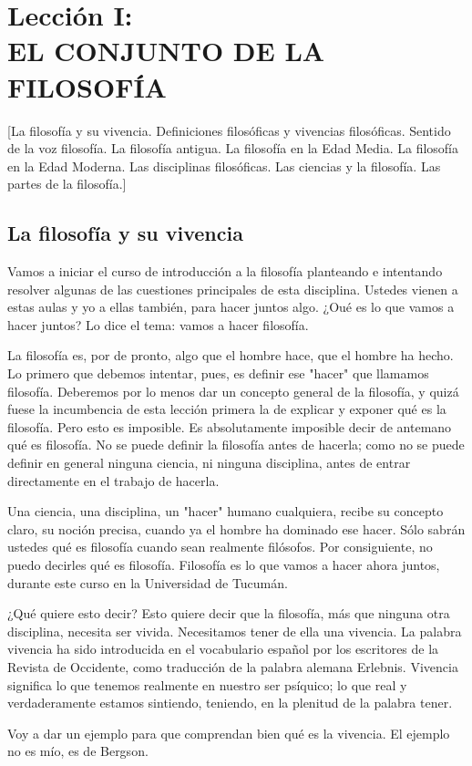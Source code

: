\documentclass[10pt,letterpaper]{book}
\author{Manuel Garc\'{i}a Morente}
\begin{document}
\chapter*{Lecci\'{o}n I:\\EL CONJUNTO DE LA FILOSOF\'{I}A}
[La filosofía y su vivencia. Definiciones filosóficas y vivencias filosóficas. Sentido de la voz filosofía. La filosofía antigua. La filosofía en la Edad Media. La filosofía en la Edad Moderna. Las disciplinas filosóficas. Las ciencias y la filosofía. Las partes de la filosofía.]
\section*{La filosofía y su vivencia}
Vamos a iniciar el curso de introducción a la filosofía planteando e intentando resolver algunas de las cuestiones principales de esta disciplina. Ustedes vienen a estas aulas y yo a ellas también, para hacer juntos algo. ¿Oué es lo que vamos a hacer juntos? Lo dice el tema: vamos a hacer filosofía.

La filosofía es, por de pronto, algo que el hombre hace, que el hombre ha hecho. Lo primero que debemos intentar, pues, es definir ese "hacer" que llamamos filosofía. Deberemos por lo menos dar un concepto general de la filosofía, y quizá fuese la incumbencia de esta lección primera la de explicar y exponer qué es la filosofía. Pero esto es imposible. Es absolutamente imposible decir de antemano qué es filosofía. No se
puede definir la filosofía antes de hacerla; como no se puede definir en general ninguna ciencia, ni ninguna disciplina, antes de entrar directamente en el trabajo de hacerla.

Una ciencia, una disciplina, un "hacer" humano cualquiera, recibe su concepto claro, su noción precisa, cuando ya el hombre ha dominado ese hacer. Sólo sabrán ustedes qué es filosofía cuando sean realmente filósofos. Por consiguiente, no puedo decirles qué es filosofía. Filosofía es lo que vamos a hacer ahora juntos, durante este curso en la Universidad de Tucumán.

¿Qué quiere esto decir? Esto quiere decir que la filosofía, más que ninguna otra disciplina, necesita ser vivida. Necesitamos tener de ella una \guillemotleft vivencia\guillemotright. La palabra vivencia ha sido introducida en el vocabulario español por los escritores de la Revista de Occidente, como traducción de la palabra alemana \guillemotleft Erlebnis\guillemotright. Vivencia significa lo que tenemos realmente en nuestro ser psíquico; lo que real y verdaderamente estamos sintiendo, teniendo, en la plenitud de la palabra \guillemotleft tener\guillemotright.

Voy a dar un ejemplo para que comprendan bien qué es la \guillemotleft vivencia\guillemotright. El ejemplo no es mío, es de Bergson.

\end{document}
